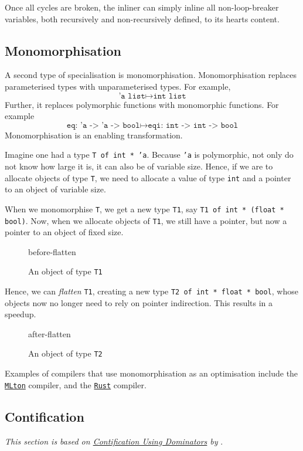 Once all cycles are broken, the inliner can simply inline all non-loop-breaker variables, both recursively and non-recursively defined, to its hearts content. 

\subsection{Monomorphisation}
A second type of specialisation is monomorphisation. Monomorphisation replaces parameterised types with unparameterised types. For example, 
\[\texttt{'a list} \mapsto \texttt{int list}\]
Further, it replaces polymorphic functions with monomorphic functions. For example
\[\texttt{eq: 'a -> 'a -> bool} \mapsto \texttt{eqi: int -> int -> bool}\]
Monomorphisation is an enabling transformation. 

Imagine one had a type \texttt{T of int * 'a}. Because \texttt{'a} is polymorphic, not only do not know how large it is, it can also be of variable size. Hence, if we are to allocate objects of type \texttt{T}, we need to allocate a value of type \texttt{int} and a pointer to an object of variable size. 

When we monomorphise \texttt{T}, we get a new type \texttt{T1}, say \texttt{T1 of int * (float * bool)}. Now, when we allocate objects of \texttt{T1}, we still have a pointer, but now a pointer to an object of fixed size. 

\begin{figure}[H]
    \centering
    {before-flatten}
    \caption{An object of type \texttt{T1}}
    \label{fig:before-flatten}
\end{figure}

Hence, we can \textit{flatten} \texttt{T1}, creating a new type \texttt{T2 of int * float * bool}, whose objects now no longer need to rely on pointer indirection. This results in a speedup. 

\begin{figure}[H]
    \centering
    {after-flatten}
    \caption{An object of type \texttt{T2}}
    \label{fig:after-flatten}
\end{figure}

Examples of compilers that use monomorphisation as an optimisation include the \href{http://www.mlton.org/References.attachments/060916-mlton.pdf}{\texttt{MLton}} compiler, and the \href{https://rustc-dev-guide.rust-lang.org/backend/monomorph.html}{\texttt{Rust}} compiler.

\subsection{Contification}
\textit{This section is based on \href{https://dl.acm.org/doi/abs/10.1145/507635.507639}{Contification Using Dominators} by } \citet{fluet-weeks-2001}.


